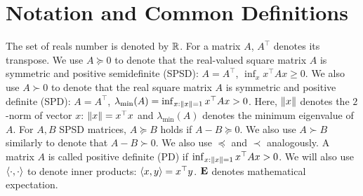 \section{Notation and Common Definitions}
\label{sec:not}

The set of reals number is denoted by $\mathbb{R}$.
For a matrix $A$, $A^\top$ denotes its transpose.
We use $A\succeq 0$ to denote that the real-valued  
square matrix $A$ is symmetric and positive semidefinite (SPSD):
$A = A^\top$, $\inf_x x^\top A x\ge 0$.
We also use $A \succ 0$ to denote that the real square matrix $A$ is symmetric and positive definite (SPD):
$A = A^\top$, $\lambda_{\min}(A) =\inf_{x:\left\| x\right\|=1} x^\top A x>0$. 
Here, $\left\| x\right\|$ denotes the $2$-norm of vector $x$: $\left\| x\right\| = x^\top x$ and 
$\lambda_{\min}(A)$ denotes the minimum eigenvalue of $A$.
For $A,B$ SPSD matrices, $A\succeq B$ holds if $A-B\succeq 0$.
We also use $A\succ B$ similarly to denote that $A-B \succ 0$.
We also use $\preceq$ and $\prec$ analogously.
%
A matrix $A$ is called positive definite (PD) if $\inf_{x:\left\| x\right\|=1} x^\top A x >0$.
%
We will also use $\langle\cdot,\cdot\rangle$ to denote inner products: $\langle x,y\rangle = x^\top y$.
%
$\mathbf{E}$ denotes mathematical expectation.


